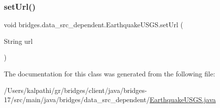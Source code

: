 \mbox{\label{classbridges_1_1data__src__dependent_1_1_earthquake_u_s_g_s_aaa9d26333e7b80d0f72da58ea2ad41d1}} 
\subsubsection{\texorpdfstring{set\+Url()}{setUrl()}}
{\footnotesize\ttfamily void bridges.\+data\+\_\+src\+\_\+dependent.\+Earthquake\+U\+S\+G\+S.\+set\+Url (\begin{DoxyParamCaption}\item[{String}]{url }\end{DoxyParamCaption})}



The documentation for this class was generated from the following file\+:\begin{DoxyCompactItemize}
\item 
/\+Users/kalpathi/gr/bridges/client/java/bridges-\/17/src/main/java/bridges/data\+\_\+src\+\_\+dependent/\mbox{\hyperlink{_earthquake_u_s_g_s_8java}{Earthquake\+U\+S\+G\+S.\+java}}\end{DoxyCompactItemize}
